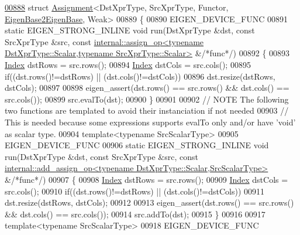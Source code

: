 \begin{DoxyCode}
\hyperlink{struct_eigen_1_1internal_1_1_assignment_3_01_dst_xpr_type_00_01_src_xpr_type_00_01_functor_00_018d07b9941c0091b62a0d03d702c7ac1b}{00888} \textcolor{keyword}{struct }\hyperlink{struct_eigen_1_1internal_1_1_assignment}{Assignment}<DstXprType, SrcXprType, Functor, \hyperlink{struct_eigen_1_1internal_1_1_eigen_base2_eigen_base}{EigenBase2EigenBase}, Weak>
00889 \{
00890   EIGEN\_DEVICE\_FUNC
00891   \textcolor{keyword}{static} EIGEN\_STRONG\_INLINE \textcolor{keywordtype}{void} run(DstXprType &dst, \textcolor{keyword}{const} SrcXprType &src, \textcolor{keyword}{const} 
      \hyperlink{struct_eigen_1_1internal_1_1assign__op}{internal::assign\_op<typename DstXprType::Scalar,typename SrcXprType::Scalar>}
       &\textcolor{comment}{/*func*/})
00892   \{
00893     \hyperlink{namespace_eigen_a62e77e0933482dafde8fe197d9a2cfde}{Index} dstRows = src.rows();
00894     \hyperlink{namespace_eigen_a62e77e0933482dafde8fe197d9a2cfde}{Index} dstCols = src.cols();
00895     \textcolor{keywordflow}{if}((dst.rows()!=dstRows) || (dst.cols()!=dstCols))
00896       dst.resize(dstRows, dstCols);
00897 
00898     eigen\_assert(dst.rows() == src.rows() && dst.cols() == src.cols());
00899     src.evalTo(dst);
00900   \}
00901 
00902   \textcolor{comment}{// NOTE The following two functions are templated to avoid their instanciation if not needed}
00903   \textcolor{comment}{//      This is needed because some expressions supports evalTo only and/or have 'void' as scalar type.}
00904   \textcolor{keyword}{template}<\textcolor{keyword}{typename} SrcScalarType>
00905   EIGEN\_DEVICE\_FUNC
00906   \textcolor{keyword}{static} EIGEN\_STRONG\_INLINE \textcolor{keywordtype}{void} run(DstXprType &dst, \textcolor{keyword}{const} SrcXprType &src, \textcolor{keyword}{const} 
      \hyperlink{struct_eigen_1_1internal_1_1add__assign__op}{internal::add\_assign\_op<typename DstXprType::Scalar,SrcScalarType>}
       &\textcolor{comment}{/*func*/})
00907   \{
00908     \hyperlink{namespace_eigen_a62e77e0933482dafde8fe197d9a2cfde}{Index} dstRows = src.rows();
00909     \hyperlink{namespace_eigen_a62e77e0933482dafde8fe197d9a2cfde}{Index} dstCols = src.cols();
00910     \textcolor{keywordflow}{if}((dst.rows()!=dstRows) || (dst.cols()!=dstCols))
00911       dst.resize(dstRows, dstCols);
00912 
00913     eigen\_assert(dst.rows() == src.rows() && dst.cols() == src.cols());
00914     src.addTo(dst);
00915   \}
00916 
00917   \textcolor{keyword}{template}<\textcolor{keyword}{typename} SrcScalarType>
00918   EIGEN\_DEVICE\_FUNC

\end{DoxyCode}
